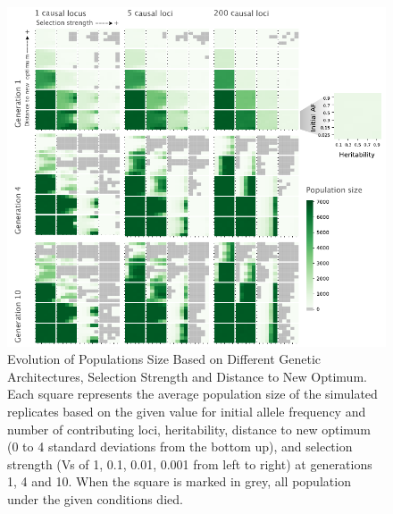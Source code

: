 \documentclass{article}
\begin{document}
\begin{figure}[b]
    \centering
    \includegraphics[width=1\textwidth]{figures/pop_size_poly_overtime.pdf}
    \caption{Evolution of Populations Size Based on Different Genetic Architectures, Selection Strength and Distance to New Optimum. Each square represents the average population size of the simulated replicates based on the given value for initial allele frequency and number of contributing loci, heritability, distance to new optimum (0 to 4 standard deviations from the bottom up), and selection strength (Vs of 1, 0.1, 0.01, 0.001 from left to right) at generations 1, 4 and 10. When the square is marked in grey, all population under the given conditions died.}
    \label{fig:pop_size_poly_overtime}
\end{figure}
\end{document}

